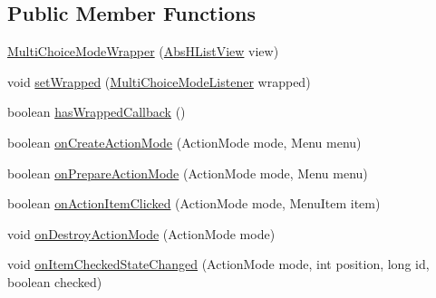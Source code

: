 \subsection*{Public Member Functions}
\begin{DoxyCompactItemize}
\item 
\hyperlink{classit_1_1sephiroth_1_1android_1_1library_1_1util_1_1v11_1_1_multi_choice_mode_wrapper_ad8ff151ec854981738bc62d4b93cbde6}{Multi\+Choice\+Mode\+Wrapper} (\hyperlink{classit_1_1sephiroth_1_1android_1_1library_1_1widget_1_1_abs_h_list_view}{Abs\+H\+List\+View} view)
\item 
void \hyperlink{classit_1_1sephiroth_1_1android_1_1library_1_1util_1_1v11_1_1_multi_choice_mode_wrapper_a580febdb3cf8f1a210b6b03a4354edfb}{set\+Wrapped} (\hyperlink{interfaceit_1_1sephiroth_1_1android_1_1library_1_1util_1_1v11_1_1_multi_choice_mode_listener}{Multi\+Choice\+Mode\+Listener} wrapped)
\item 
boolean \hyperlink{classit_1_1sephiroth_1_1android_1_1library_1_1util_1_1v11_1_1_multi_choice_mode_wrapper_a075493777dd8398a7aa197c3f67f94eb}{has\+Wrapped\+Callback} ()
\item 
boolean \hyperlink{classit_1_1sephiroth_1_1android_1_1library_1_1util_1_1v11_1_1_multi_choice_mode_wrapper_a1d021eefb84facb1769585dbd66caa42}{on\+Create\+Action\+Mode} (Action\+Mode mode, Menu menu)
\item 
boolean \hyperlink{classit_1_1sephiroth_1_1android_1_1library_1_1util_1_1v11_1_1_multi_choice_mode_wrapper_a3881993e1f2065478314c0bafa108564}{on\+Prepare\+Action\+Mode} (Action\+Mode mode, Menu menu)
\item 
boolean \hyperlink{classit_1_1sephiroth_1_1android_1_1library_1_1util_1_1v11_1_1_multi_choice_mode_wrapper_ab0ce1c1a4ca7a0875b2ec51cf2b61115}{on\+Action\+Item\+Clicked} (Action\+Mode mode, Menu\+Item item)
\item 
void \hyperlink{classit_1_1sephiroth_1_1android_1_1library_1_1util_1_1v11_1_1_multi_choice_mode_wrapper_a75e476008275bcb0294cc814d6cc6ce2}{on\+Destroy\+Action\+Mode} (Action\+Mode mode)
\item 
void \hyperlink{classit_1_1sephiroth_1_1android_1_1library_1_1util_1_1v11_1_1_multi_choice_mode_wrapper_a6981e606cfdd2ce993c09ea6d0b24605}{on\+Item\+Checked\+State\+Changed} (Action\+Mode mode, int position, long id, boolean checked)
\end{DoxyCompactItemize}


